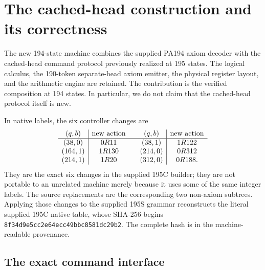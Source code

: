 \section{The cached-head construction and its correctness}
\label{sec:new-cached-proof}

The new 194-state machine combines the supplied PA194 axiom decoder
with the cached-head command protocol previously realized at 195 states.
The logical calculus, the 190-token separate-head axiom emitter, the
physical register layout, and the arithmetic engine are retained.
The contribution is the verified composition at 194 states. In particular,
we do not claim that the cached-head protocol itself is new.

In native labels, the six controller changes are
\[
\begin{array}{c|c@{\qquad}c|c}
(q,b)&\text{new action}&(q,b)&\text{new action}\\\hline
(38,0)&0R11&(38,1)&1R122\\
(164,1)&1R130&(214,0)&0R312\\
(214,1)&1R20&(312,0)&0R188.
\end{array}
\]
They are the exact six changes in the supplied 195C builder; they are not
portable to an unrelated machine merely because it uses some of the same
integer labels. The source replacements are the corresponding two
non-axiom subtrees. Applying those changes to the supplied 195S grammar
reconstructs the literal supplied 195C native table, whose SHA-256 begins
\texttt{8f34d9e5cc2e64ecc49bbc8581dc29b2}. The complete hash is in the
machine-readable provenance.

\subsection{The exact command interface}

